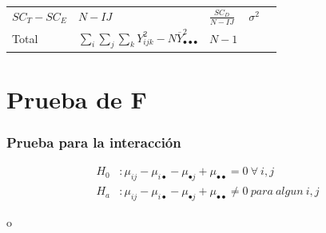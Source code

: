 \documentclass[]{book}
\theoremstyle{definition}
\theoremstyle{definition}
\theoremstyle{definition}
\theoremstyle{remark}
\begin{document}
\begin{longtable}[]{@{}lllll@{}}
\begin{minipage}[t]{0.29\columnwidth}
\(SC_{T} - SC_{E}\)\strut
\end{minipage} & \begin{minipage}[t]{0.02\columnwidth}\raggedright
\(N-IJ\)\strut
\end{minipage} & \begin{minipage}[t]{0.13\columnwidth}\raggedright
\(\frac{SC_{D}}{N - IJ}\)\strut
\end{minipage} & \begin{minipage}[t]{0.37\columnwidth}\raggedright
\(\sigma^{2}\)\strut
\end{minipage}\tabularnewline
\begin{minipage}[t]{0.04\columnwidth}\raggedright
Total\strut
\end{minipage} & \begin{minipage}[t]{0.29\columnwidth}\raggedright
\(\sum_{i}^{}{\sum_{j}^{}{\sum_{k}^{}Y_{ijk}^{2}}} - N\overline{Y}_{\bullet \bullet \bullet}^{2}\)\strut
\end{minipage} & \begin{minipage}[t]{0.02\columnwidth}\raggedright
\(N-1\)\strut
\end{minipage} & \begin{minipage}[t]{0.13\columnwidth}\raggedright
\strut
\end{minipage} & \begin{minipage}[t]{0.37\columnwidth}\raggedright
\strut
\end{minipage}\tabularnewline
\bottomrule
\end{longtable}

\hypertarget{prueba-de-f}{%
\section{Prueba de F}\label{prueba-de-f}}

\hypertarget{prueba-para-la-interaccion}{%
\subsubsection{Prueba para la
interacción}\label{prueba-para-la-interaccion}}

\[
\begin{aligned}
H_{0}&:\mu_{ij} - \mu_{i \bullet} - \mu_{\bullet j} + \mu_{\bullet \bullet} = 0\ \forall\ i,j\\
H_{a}&:\mu_{ij} - \mu_{i \bullet} - \mu_{\bullet j} + \mu_{\bullet \bullet} \neq 0\ para\ algun\ i,j
\end{aligned}
\]

o
\end{document}
